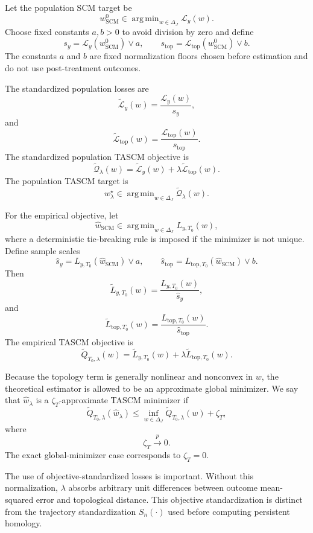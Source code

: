 \documentclass[11pt]{article}
\theoremstyle{plain}
\theoremstyle{definition}
\theoremstyle{remark}
\DeclareMathOperator*{\argmin}{arg\,min}
\newcommand{\1}{\mathbbm{1}}
\newcommand{\SCM}{\mathrm{SCM}}
\newcommand{\pto}{\xrightarrow{p}}
\begin{document}
Let the population SCM target be
\[
w_{\SCM}^0
\in
\argmin_{w\in\Delta_J}\mathcal L_y(w).
\]
Choose fixed constants \(a,b>0\) to avoid division by zero and define
\[
s_y
=
\mathcal L_y(w_{\SCM}^0)\vee a,
\qquad
s_{\mathrm{top}}
=
\mathcal L_{\mathrm{top}}(w_{\SCM}^0)\vee b.
\]
The constants \(a\) and \(b\) are fixed normalization floors chosen before
estimation and do not use post-treatment outcomes.

The standardized population losses are
\[
\widetilde{\mathcal L}_y(w)
=
\frac{\mathcal L_y(w)}{s_y},
\]
and
\[
\widetilde{\mathcal L}_{\mathrm{top}}(w)
=
\frac{\mathcal L_{\mathrm{top}}(w)}{s_{\mathrm{top}}}.
\]
The standardized population TASCM objective is
\[
\widetilde{\mathcal Q}_{\lambda}(w)
=
\widetilde{\mathcal L}_y(w)
+
\lambda
\widetilde{\mathcal L}_{\mathrm{top}}(w).
\]
The population TASCM target is
\[
w_{\lambda}^{\star}
\in
\argmin_{w\in\Delta_J}
\widetilde{\mathcal Q}_{\lambda}(w).
\]

For the empirical objective, let
\[
\widehat w_{\SCM}
\in
\argmin_{w\in\Delta_J}L_{y,T_0}(w),
\]
where a deterministic tie-breaking rule is imposed if the minimizer is not
unique. Define sample scales
\[
\widehat s_y
=
L_{y,T_0}(\widehat w_{\SCM})\vee a,
\qquad
\widehat s_{\mathrm{top}}
=
L_{\mathrm{top},T_0}(\widehat w_{\SCM})\vee b.
\]
Then
\[
\widetilde L_{y,T_0}(w)
=
\frac{L_{y,T_0}(w)}{\widehat s_y},
\]
and
\[
\widetilde L_{\mathrm{top},T_0}(w)
=
\frac{L_{\mathrm{top},T_0}(w)}{\widehat s_{\mathrm{top}}}.
\]
The empirical TASCM objective is
\[
\widetilde Q_{T_0,\lambda}(w)
=
\widetilde L_{y,T_0}(w)
+
\lambda
\widetilde L_{\mathrm{top},T_0}(w).
\]

Because the topology term is generally nonlinear and nonconvex in \(w\), the
theoretical estimator is allowed to be an approximate global minimizer. We say
that \(\widehat w_\lambda\) is a \(\zeta_T\)-approximate TASCM minimizer if
\[
\widetilde Q_{T_0,\lambda}(\widehat w_\lambda)
\le
\inf_{w\in\Delta_J}
\widetilde Q_{T_0,\lambda}(w)
+
\zeta_T,
\]
where
\[
\zeta_T\pto 0.
\]
The exact global-minimizer case corresponds to \(\zeta_T=0\).

The use of objective-standardized losses is important. Without this
normalization, \(\lambda\) absorbs arbitrary unit differences between outcome
mean-squared error and topological distance. This objective standardization is
distinct from the trajectory standardization \(S_n(\cdot)\) used before
computing persistent homology.

\end{document}
